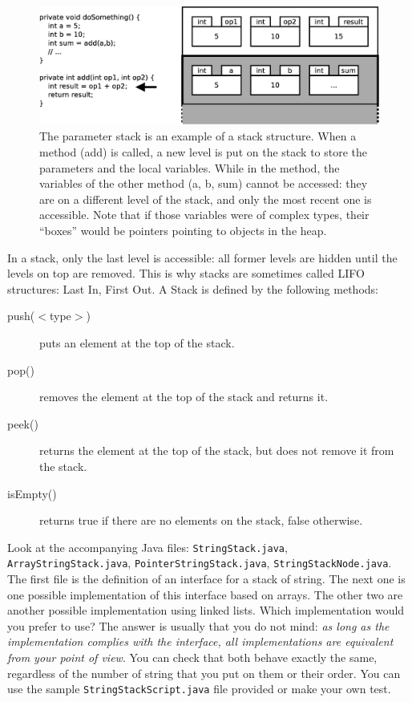 \begin{figure}[tbp]
  \centering
  \includegraphics[width=\textwidth]{gfx/parameter-stack}
  \caption{The parameter stack is an example of a stack
    structure. When a method (add) is called, a new level is put on the
    stack to store the parameters and the local variables. While in
    the method, the variables of the other method (a, b, sum) cannot
    be accessed: they are on a different level of the stack, and only
    the most recent one is accessible. Note that if those variables
    were of complex types, their ``boxes'' would be pointers pointing
    to objects in the heap.}
  \label{fig:stackparameter}
\end{figure}

In a stack, only the last level is accessible: all former levels are
hidden until the levels on top are removed. This is why stacks are
sometimes called LIFO structures: Last In, First Out. A Stack is
defined by the following methods:

\begin{description}
\item[push($<$type$>$)] puts an element at the top of the stack.
\item[pop() ] removes the element at the top of the
  stack and returns it. 
\item[peek() ] returns the element at the top of the stack, but
  does not remove it from the stack.
\item[isEmpty() ] returns true if there are no elements on the stack,
  false otherwise.
\end{description}

Look at the accompanying Java files: \verb+StringStack.java+,
\verb+ArrayStringStack.java+, \verb+PointerStringStack.java+,
\verb+StringStackNode.java+.  The first file is the definition of an
interface for a stack of string. The next one is one possible
implementation of this interface based on arrays. The other two are
another possible implementation using linked lists. Which
implementation would you prefer to use? The answer is usually that you
do not mind: \emph{as long as the implementation complies with the
  interface, all implementations are equivalent from your point of
  view}. You can check that both behave exactly the same, regardless
of the number of string that you put on them or their order. You can
use the sample \verb+StringStackScript.java+ file provided or make
your own test.

